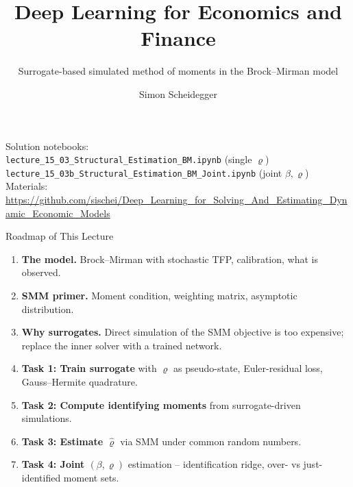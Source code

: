 \documentclass[10pt,aspectratio=169]{beamer}
\title[Deep Learning for Dynamic Economic Models]
{Deep Learning for Economics and Finance}
\subtitle{Surrogate-based simulated method of moments in the Brock--Mirman model}
\author{Simon Scheidegger}
\institute[HEC Lausanne]{HEC, University of Lausanne}
\date{}
\begin{document}
{
\begin{frame}
\titlepage
\vspace{-0.3cm}
\begin{center}
{\footnotesize Solution notebooks:}\\[1pt]
{\footnotesize \texttt{lecture\_15\_03\_Structural\_Estimation\_BM.ipynb} (single $\varrho$)}\\
{\footnotesize \texttt{lecture\_15\_03b\_Structural\_Estimation\_BM\_Joint.ipynb} (joint $\beta,\varrho$)}\\[2pt]
{\footnotesize Materials: \url{https://github.com/sischei/Deep_Learning_for_Solving_And_Estimating_Dynamic_Economic_Models}}
\end{center}
\end{frame}
}

\begin{frame}{Roadmap of This Lecture}
\small
\begin{enumerate}
    \item \textbf{The model.} Brock--Mirman with stochastic TFP, calibration, what is observed.
    \vspace{0.2em}
    \item \textbf{SMM primer.} Moment condition, weighting matrix, asymptotic distribution.
    \vspace{0.2em}
    \item \textbf{Why surrogates.} Direct simulation of the SMM objective is too expensive; replace the inner solver with a trained network.
    \vspace{0.2em}
    \item \textbf{Task 1: Train surrogate} with $\varrho$ as pseudo-state, Euler-residual loss, Gauss--Hermite quadrature.
    \vspace{0.2em}
    \item \textbf{Task 2: Compute identifying moments} from surrogate-driven simulations.
    \vspace{0.2em}
    \item \textbf{Task 3: Estimate $\hat\varrho$} via SMM under common random numbers.
    \vspace{0.2em}
    \item \textbf{Task 4: Joint $(\beta, \varrho)$} estimation -- identification ridge, over- vs just-identified moment sets.
\end{enumerate}
\end{frame}
\end{document}
